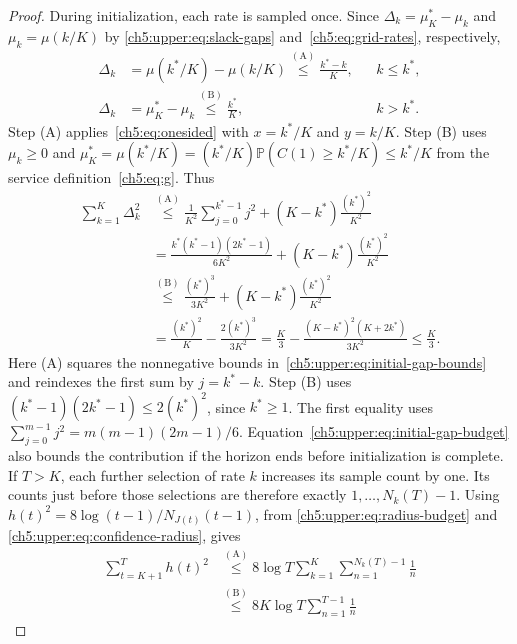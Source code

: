 \begin{proof}
During initialization, each rate is
sampled once. Since $\Delta_k=\mu_K^*-\mu_k$ and $\mu_k=\mu(k/K)$ by
\eqref{ch5:upper:eq:slack-gaps} and~\eqref{ch5:eq:grid-rates}, respectively,
\begin{equation}
\begin{aligned}
\Delta_k&=\mu(k^*/K)-\mu(k/K)
  \overset{\mathrm{(A)}}{\le}\frac{k^*-k}{K}, &&k\le k^*,\\
\Delta_k&=\mu_K^*-\mu_k
  \overset{\mathrm{(B)}}{\le}\frac{k^*}{K}, &&k>k^*.
\end{aligned}
\label{ch5:upper:eq:initial-gap-bounds}
\end{equation}
Step (A) applies~\eqref{ch5:eq:onesided} with $x=k^*/K$ and
$y=k/K$. Step (B) uses $\mu_k\ge0$ and
$\mu_K^*=\mu(k^*/K)=(k^*/K)\mathbb P(C(1)\ge k^*/K)\le k^*/K$
from the service definition~\eqref{ch5:eq:g}.
Thus
\begin{equation}
\begin{aligned}
\sum_{k=1}^{K}\Delta_k^2
 &\overset{\mathrm{(A)}}{\le}\frac1{K^2}\sum_{j=0}^{k^*-1}j^2
 +(K-k^*)\frac{(k^*)^2}{K^2}\\
&=\frac{k^*(k^*-1)(2k^*-1)}{6K^2}
 +(K-k^*)\frac{(k^*)^2}{K^2}\\
&\overset{\mathrm{(B)}}{\le}\frac{(k^*)^3}{3K^2}
 +(K-k^*)\frac{(k^*)^2}{K^2}\\
&=\frac{(k^*)^2}{K}-\frac{2(k^*)^3}{3K^2}
=\frac K3-\frac{(K-k^*)^2(K+2k^*)}{3K^2}
 \le\frac K3.
\end{aligned}
\label{ch5:upper:eq:initial-gap-budget}
\end{equation}
Here (A) squares the nonnegative bounds
in~\eqref{ch5:upper:eq:initial-gap-bounds} and reindexes the first
sum by $j=k^*-k$. Step (B) uses
$(k^*-1)(2k^*-1)\le2(k^*)^2$, since $k^*\ge1$.
The first equality uses $\sum_{j=0}^{m-1}j^2=m(m-1)(2m-1)/6$.
Equation~\eqref{ch5:upper:eq:initial-gap-budget} also bounds the contribution if the horizon ends before
initialization is complete. If $T>K$, each further selection of rate $k$
increases its sample count by one. Its counts just before those selections
are therefore exactly $1,\ldots,N_k(T)-1$. Using
$h(t)^2=8\log(t-1)/N_{J(t)}(t-1)$, from
\eqref{ch5:upper:eq:radius-budget} and
\eqref{ch5:upper:eq:confidence-radius}, gives
\begin{equation}
\begin{aligned}
\sum_{t=K+1}^{T}h(t)^2
 &\overset{\mathrm{(A)}}{\le}8\log T\sum_{k=1}^{K}\sum_{n=1}^{N_k(T)-1}\frac1n\\
 &\overset{\mathrm{(B)}}{\le}8K\log T\sum_{n=1}^{T-1}\frac1n

\end{aligned}
\end{equation}
\end{proof}
